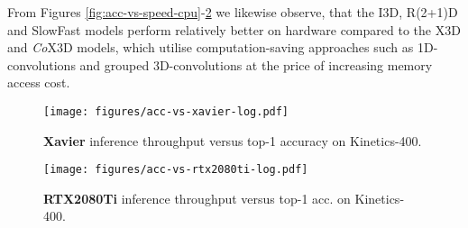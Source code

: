 
From Figures \ref{fig:acc-vs-speed-cpu}-\ref{fig:acc-vs-speed-rtx} we likewise observe, that the I3D, R(2+1)D and SlowFast models perform relatively better on hardware compared to the X3D and \textit{Co}X3D models, which utilise computation-saving approaches such as 1D-convolutions and grouped 3D-convolutions at the price of increasing memory access cost.


\begin{figure}[b]
    \centering
    \texttt{[image: figures/acc-vs-xavier-log.pdf]}
    \caption{\textbf{Xavier} inference throughput versus top-1 accuracy on Kinetics-400.}
    \label{fig:acc-vs-speed-xavier}
\end{figure}

\begin{figure}[!b]
    \centering
    \texttt{[image: figures/acc-vs-rtx2080ti-log.pdf]}
    \caption{\textbf{RTX2080Ti} inference throughput versus top-1 acc. on Kinetics-400.}
    \label{fig:acc-vs-speed-rtx}
\end{figure}

